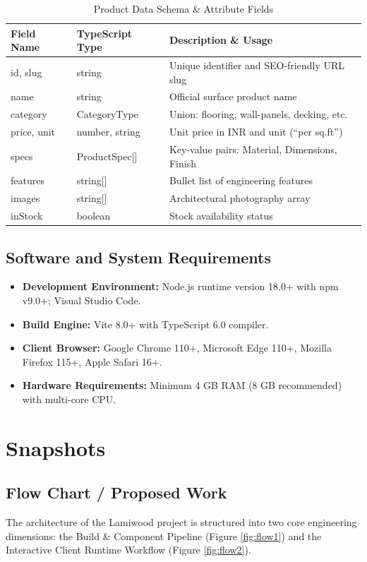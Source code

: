 \documentclass[12pt,a4paper]{report}
\begin{document}
\begin{table}[htbp]
\centering
\caption{Product Data Schema \& Attribute Fields}
\label{tab:schema}
\begin{tabular}{lll}
\toprule
\textbf{Field Name} & \textbf{TypeScript Type} & \textbf{Description \& Usage} \\
\midrule
id, slug & string & Unique identifier and SEO-friendly URL slug \\
name & string & Official surface product name \\
category & CategoryType & Union: flooring, wall-panels, decking, etc. \\
price, unit & number, string & Unit price in INR and unit (``per sq.ft'') \\
specs & ProductSpec[] & Key-value pairs: Material, Dimensions, Finish \\
features & string[] & Bullet list of engineering features \\
images & string[] & Architectural photography array \\
inStock & boolean & Stock availability status \\
\bottomrule
\end{tabular}
\end{table}

\section{Software and System Requirements}
\begin{itemize}
    \item \textbf{Development Environment:} Node.js runtime version 18.0+ with npm v9.0+; Visual Studio Code.
    \item \textbf{Build Engine:} Vite 8.0+ with TypeScript 6.0 compiler.
    \item \textbf{Client Browser:} Google Chrome 110+, Microsoft Edge 110+, Mozilla Firefox 115+, Apple Safari 16+.
    \item \textbf{Hardware Requirements:} Minimum 4 GB RAM (8 GB recommended) with multi-core CPU.
\end{itemize}

\chapter{Snapshots}

\section{Flow Chart / Proposed Work}
The architecture of the Lamiwood project is structured into two core engineering dimensions: the Build \& Component Pipeline (Figure \ref{fig:flow1}) and the Interactive Client Runtime Workflow (Figure \ref{fig:flow2}).
\end{document}
